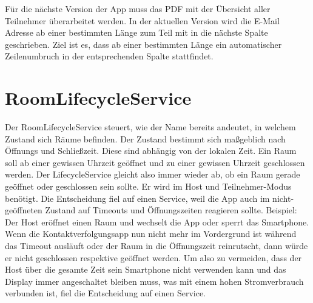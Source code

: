 Für die nächste Version der App muss das PDF mit der Übersicht aller Teilnehmer überarbeitet werden. In der aktuellen Version wird die E-Mail Adresse ab einer bestimmten Länge zum Teil mit in die nächste Spalte geschrieben. Ziel ist es, dass ab einer bestimmten Länge ein automatischer Zeilenumbruch in der entsprechenden Spalte stattfindet.

\section{RoomLifecycleService}
\label{sec:RoomLifecycleService}
Der RoomLifecycleService steuert, wie der Name bereits andeutet, in welchem Zustand sich Räume befinden. Der Zustand bestimmt sich maßgeblich nach Öffnungs und Schließzeit. Diese sind abhängig von der lokalen Zeit. Ein Raum soll ab einer gewissen Uhrzeit geöffnet und zu einer gewissen Uhrzeit geschlossen werden. Der LifecycleService gleicht also immer wieder ab, ob ein Raum gerade geöffnet oder geschlossen sein sollte.
Er wird im Host und Teilnehmer-Modus benötigt. 
Die Entscheidung fiel auf einen Service, weil die App auch im nicht-geöffneten Zustand auf Timeouts und Öffnungszeiten reagieren sollte.
Beispiel: Der Host eröffnet einen Raum und wechselt die App oder sperrt das Smartphone. Wenn die Kontaktverfolgungsapp nun nicht mehr im Vordergrund ist während das Timeout ausläuft oder der Raum in die Öffnungszeit reinrutscht, dann würde er nicht geschlossen respektive geöffnet werden. 
Um also zu vermeiden, dass der Host über die gesamte Zeit sein Smartphone nicht verwenden kann und das Display immer angeschaltet bleiben muss, was mit einem hohen Stromverbrauch verbunden ist, fiel die Entscheidung auf einen Service.


